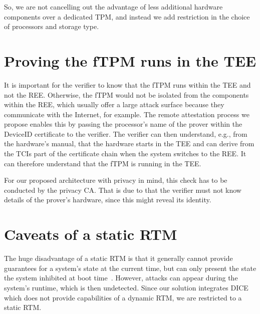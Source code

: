 So, we are not cancelling out the advantage of less additional hardware components over a dedicated TPM, and instead we add restriction in the choice of processors and storage type.




\section{Proving the fTPM runs in the TEE}

It is important for the verifier to know that the fTPM runs within the TEE and not the REE\@.
Otherwise, the fTPM would not be isolated from the components within the REE, which usually offer a large attack surface because they communicate with the Internet, for example.
The remote attestation process we propose enables this by passing the processor's name of the prover within the DeviceID certificate to the verifier.
The verifier can then understand, e.g., from the hardware's manual, that the hardware starts in the TEE and can derive from the TCIs part of the certificate chain when the system switches to the REE\@.
It can therefore understand that the fTPM is running in the TEE\@.

For our proposed architecture with privacy in mind, this check has to be conducted by the privacy CA\@.
That is due to that the verifier must not know details of the prover's hardware, since this might reveal its identity.

\section{Caveats of a static RTM}

The huge disadvantage of a static RTM is that it generally cannot provide guarantees for a system's state at the current time, but can only present the state the system inhibited at boot time~\cite{EURECOM+3536}.
However, attacks can appear during the system's runtime, which is then undetected.
Since our solution integrates DICE which does not provide capabilities of a dynamic RTM, we are restricted to a static RTM\@.
